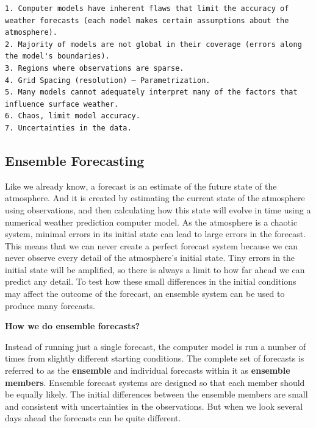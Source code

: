 \documentclass[12pt,oneside]{book}
\begin{document}
\begin{verbatim}
1. Computer models have inherent flaws that limit the accuracy of weather forecasts (each model makes certain assumptions about the atmosphere).
2. Majority of models are not global in their coverage (errors along the model's boundaries).
3. Regions where observations are sparse.
4. Grid Spacing (resolution) – Parametrization.
5. Many models cannot adequately interpret many of the factors that influence surface weather.
6. Chaos, limit model accuracy.
7. Uncertainties in the data.
\end{verbatim}

\subsection{Ensemble Forecasting}\label{ensemble-forecasting}

Like we already know, a forecast is an estimate of the future state of
the atmosphere. And it is created by estimating the current state of the
atmosphere using observations, and then calculating how this state will
evolve in time using a numerical weather prediction computer model. As
the atmosphere is a chaotic system, minimal errors in its initial state
can lead to large errors in the forecast. This means that we can never
create a perfect forecast system because we can never observe every
detail of the atmosphere's initial state. Tiny errors in the initial
state will be amplified, so there is always a limit to how far ahead we
can predict any detail. To test how these small differences in the
initial conditions may affect the outcome of the forecast, an ensemble
system can be used to produce many forecasts.

\textbf{How we do ensemble forecasts?}

Instead of running just a single forecast, the computer model is run a
number of times from slightly different starting conditions. The
complete set of forecasts is referred to as the \textbf{ensemble} and
individual forecasts within it as \textbf{ensemble members}. Ensemble
forecast systems are designed so that each member should be equally
likely. The initial differences between the ensemble members are small
and consistent with uncertainties in the observations. But when we look
several days ahead the forecasts can be quite different.
\end{document}
